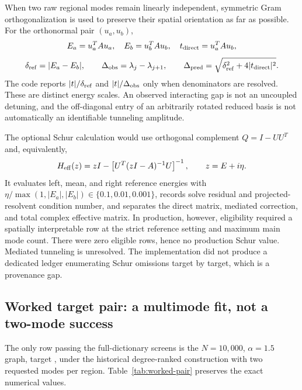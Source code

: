 \documentclass[11pt]{article}
\begin{document}
When two raw regional modes remain linearly independent, symmetric Gram orthogonalization is used to preserve their spatial orientation as far as possible.  For the orthonormal pair \((u_a,u_b)\),
\[
 E_a=u_a^TAu_a,\quad E_b=u_b^TAu_b,\quad
 t_{\rm direct}=u_a^TAu_b,
\]
\[
 \delta_{\rm ref}=|E_a-E_b|,\qquad
 \Delta_{\rm obs}=\lambda_j-\lambda_{j+1},\qquad
 \Delta_{\rm pred}=\sqrt{\delta_{\rm ref}^2+4|t_{\rm direct}|^2}.
\]
The code reports \(|t|/\delta_{\rm ref}\) and \(|t|/\Delta_{\rm obs}\) only when denominators are resolved.  These are distinct energy scales.  An observed interacting gap is not an uncoupled detuning, and the off-diagonal entry of an arbitrarily rotated reduced basis is not automatically an identifiable tunneling amplitude.

The optional Schur calculation would use orthogonal complement \(Q=I-UU^T\) and, equivalently,
\[
 H_{\rm eff}(z)=zI-\left[U^T(zI-A)^{-1}U\right]^{-1},
 \qquad z=E+i\eta.
\]
It evaluates left, mean, and right reference energies with
\(\eta/\max(1,|E_a|,|E_b|)\in\{0.1,0.01,0.001\}\), records solve residual and projected-resolvent condition number, and separates the direct matrix, mediated correction, and total complex effective matrix.  In production, however, eligibility required a spatially interpretable row at the strict reference setting and maximum main mode count.  There were zero eligible rows, hence no production Schur value.  Mediated tunneling is unresolved.  The implementation did not produce a dedicated ledger enumerating Schur omissions target by target, which is a provenance gap.

\subsection{Worked target pair: a multimode fit, not a two-mode success}

The only row passing the full-dictionary screens is the \(N=10{,}000\), \(\alpha=1.5\) graph, target , under the historical degree-ranked construction with two requested modes per region.  Table~\ref{tab:worked-pair} preserves the exact numerical values.
\end{document}
